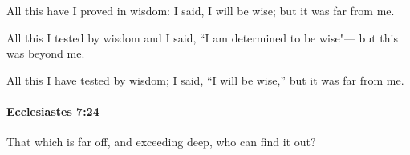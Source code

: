 			\begin{versebox}
					\item[BHS] 
					\item[LXX] 
					\item[ASV] All this have I proved in wisdom: I said, I will be wise; but it was far from me.
					\item[NIV] All this I tested by wisdom and I said, “I am determined to be wise"— but this was beyond me.
					\item[NRSV] All this I have tested by wisdom; I said, “I will be wise,” but it was far from me.
			\end{versebox}

		\paragraph{Ecclesiastes 7:24} %
			\label{ECCLESIASTES-7-24}

			That which is far off, and exceeding deep, who can find it out?

